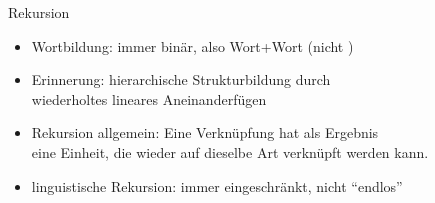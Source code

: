 \begin{frame}[fragile]
  {Rekursion}
  \pause
  \begin{itemize}[<+->]
    \item Wortbildung: immer \alert{binär}, also \alert{Wort+Wort} (nicht )
      \Viertelzeile
    \item Erinnerung: \alert{hierarchische Strukturbildung} durch \\
      wiederholtes lineares Aneinanderfügen
      \Viertelzeile
    \item Rekursion allgemein: \alert{Eine Verknüpfung hat als Ergebnis\\
      eine Einheit, die wieder auf dieselbe Art verknüpft werden kann.}
    \item linguistische Rekursion: immer eingeschränkt, nicht "`endlos"'
  \end{itemize}
  \pause
  \begin{center}
    \scalebox{0.7}{
      \begin{forest}
        [Bushaltestellenunterstandsreparatur
          [Bushaltestellenunterstand
            [Bushaltestelle
              [Bus]
              [Haltestelle
                [halten]
                [Stelle]
              ]
            ]
            [Unterstand
              [unter]
              [Stand]
            ]
          ]
          [Reparatur]
        ]
      \end{forest}
    }
  \end{center}
\end{frame}

